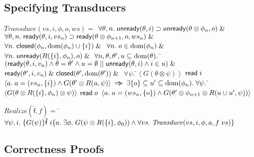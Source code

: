 \subsection{Specifying Transducers}

\begin{specification}
\nextline $\mathit{Transduce}(vs, i, \phi, o, ws)  =  $
\nextline $\forall \theta, n.\; \mathsf{unready}({\theta}, {i}) \supset \mathsf{unready}({\theta \otimes \phi_n}, {o}) \;\&\;$ 
\nextline $\forall \theta, n.\; \mathsf{ready}({\theta}, {i}, {vs_n}) \supset \mathsf{ready}({\theta \otimes \phi_{n+1}}, {o}, {ws_n}) \;\&\;$
\nextline $\forall n.\; \mathsf{closed}({\phi_n}, {\mbox{dom}({\phi_n}) \cup \{{i}\}}) \;\&\;$ 
\nextline $\forall n.\; o \in \mbox{dom}({\phi_n}) \;\&\;$
\nextline $\forall n.\; \mathsf{unready}({R(\{{i}\}, \phi_n)}, {o}) \;\&\;$
\nextline\;\; $\forall n, \theta, \theta', u \subseteq \mbox{dom}({\theta}).$  
\nextline\qquad\=$(\mathsf{ready}({\theta}, {i}, {v_n}) \land \theta = \theta' \land u = \emptyset \;||\;
                         \mathsf{unready}({\theta}, {i}) \land i \in u) \;\&\;$ 
\nextline\> $\mathsf{ready}({\theta'}, {i}, {v_n}) \;\&\; \mathsf{closed}({\theta'}, {\mbox{dom}({\theta'})}) \;\&\;$
\nextline\> $\forall \psi.\;$\=$\left<G(\theta \otimes \psi)\right>$ 
\nextline\>\> $\mathsf{read}\; i$
\nextline\>\> $\left<a.\;a = (vs_n, \{{i}\}) \land G(\theta' \otimes R(u,\psi)\right>$ 
\nextline\> $\Rightarrow\!\!\!>$ 
\nextline\> $\exists \{{o}\} \subseteq u' \subseteq \mbox{dom}({\phi_n}).\;  \forall \psi.\;$\=$\left<G(\theta \otimes R(\{{i}\}, \phi_n) \otimes \psi)\right>$ 
\nextline\>\>$\mathsf{read}\; o$ 
\nextline\>\>$\left<a.\;a = (ws_n, \{{o}\}) \land 
                        G(\theta' \otimes \phi_{n+1} \otimes R(u \cup u', \psi))\right>$ 
\end{specification}


\begin{specification}
\nextline $\mathit{Realize}(\mathsf{\hat{f}}, f) = $ 
\nextline\;\;\= $\forall \psi, i.\; \{{G(\psi)}\}{\mathsf{\hat{f}}\;i}\{{a}.\;{\exists \phi.\;G(\psi \otimes R(\{{i}\}, \phi_0)) \land \forall vs.\;\mathit{Transduce}(vs, i, \phi, a, f\;vs)}\}$
\end{specification}

\subsection{Correctness Proofs}

